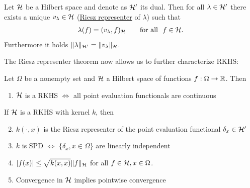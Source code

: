 \begin{thm}
\label{thm:riesz_representer_theorem}
Let $\mathcal{H}$ be a Hilbert space and denote as $\mathcal{H}'$ its dual.
Then for all $\lambda \in \mathcal{H}'$ there exists a unique $v_\lambda \in \mathcal{H}$ (\underline{Riesz representer} of $\lambda$) such that
\begin{align*}
\lambda(f) = (v_\lambda, f)_{\mathcal{H}} \qquad \text{for all ~} f \in \mathcal{H}.
\end{align*}
Furthermore it holds $\Vert \lambda \Vert_{\mathcal{H}'} = \Vert v_\lambda \Vert_{\mathcal{H}}$.
\end{thm}

The Riesz representer theorem now allows us to further characterize RKHS:


\begin{prop}
\label{prop:riesz_rksh}
Let $\Omega$ be a nonempty set and $\mathcal{H}$ a Hilbert space of functions $f: \Omega \rightarrow \mathbb{R}$. 
Then
\begin{enumerate}
\item $\mathcal{H}$ is a RKHS $\Leftrightarrow$ all point evaluation functionals are continuous
\end{enumerate}
If $\mathcal{H}$ is a RKHS with kernel $k$, then
\begin{enumerate}
\setcounter{enumi}{1}
\item $k(\cdot, x)$ is the Riesz representer of the point evaluation functional $\delta_x \in \mathcal{H}'$
\item $k$ is SPD $\Leftrightarrow$ $\{ \delta_x, x \in \Omega \}$ are linearly independent
\item $|f(x)| \leq \sqrt{k(x, x)} \Vert f \Vert_{\mathcal{H}}$ for all $f \in \mathcal{H}, x \in \Omega$.
\item Convergence in $\mathcal{H}$ implies pointwise convergence
\end{enumerate}
\end{prop}


